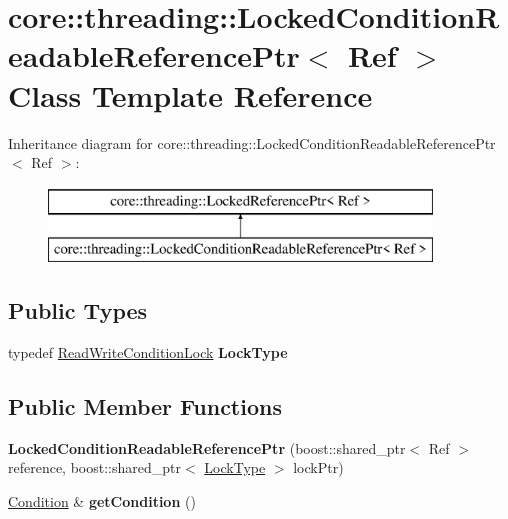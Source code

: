 \hypertarget{classcore_1_1threading_1_1_locked_condition_readable_reference_ptr}{\section{core\-:\-:threading\-:\-:Locked\-Condition\-Readable\-Reference\-Ptr$<$ Ref $>$ Class Template Reference}
\label{classcore_1_1threading_1_1_locked_condition_readable_reference_ptr}
}
Inheritance diagram for core\-:\-:threading\-:\-:Locked\-Condition\-Readable\-Reference\-Ptr$<$ Ref $>$\-:\begin{figure}[H]
\begin{center}
\leavevmode
\includegraphics[height=2.000000cm]{classcore_1_1threading_1_1_locked_condition_readable_reference_ptr}
\end{center}
\end{figure}
\subsection*{Public Types}
\begin{DoxyCompactItemize}
\item 
\hypertarget{classcore_1_1threading_1_1_locked_condition_readable_reference_ptr_a480f4a00a3bef5e925c1fb3d51799b3b}{typedef \hyperlink{classcore_1_1threading_1_1_read_write_condition_lock}{Read\-Write\-Condition\-Lock} {\bfseries Lock\-Type}}\label{classcore_1_1threading_1_1_locked_condition_readable_reference_ptr_a480f4a00a3bef5e925c1fb3d51799b3b}

\end{DoxyCompactItemize}
\subsection*{Public Member Functions}
\begin{DoxyCompactItemize}
\item 
\hypertarget{classcore_1_1threading_1_1_locked_condition_readable_reference_ptr_af7fd790de229e3606b4582fe6c3b38da}{{\bfseries Locked\-Condition\-Readable\-Reference\-Ptr} (boost\-::shared\-\_\-ptr$<$ Ref $>$ reference, boost\-::shared\-\_\-ptr$<$ \hyperlink{classcore_1_1threading_1_1_read_write_condition_lock}{Lock\-Type} $>$ lock\-Ptr)}\label{classcore_1_1threading_1_1_locked_condition_readable_reference_ptr_af7fd790de229e3606b4582fe6c3b38da}

\item 
\hypertarget{classcore_1_1threading_1_1_locked_condition_readable_reference_ptr_adba1270b37101a28445055fb187147c8}{\hyperlink{classcore_1_1threading_1_1_condition}{Condition} \& {\bfseries get\-Condition} ()}\label{classcore_1_1threading_1_1_locked_condition_readable_reference_ptr_adba1270b37101a28445055fb187147c8}

\end{DoxyCompactItemize}

